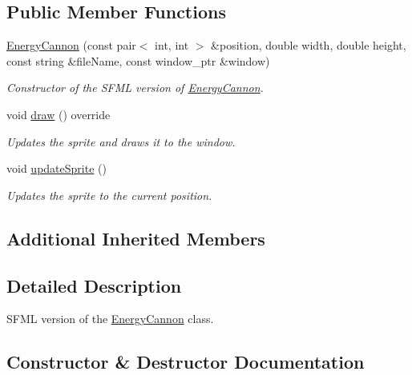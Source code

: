 \subsection*{Public Member Functions}
\begin{DoxyCompactItemize}
\item 
\hyperlink{classGameSFML_1_1EnergyCannon_a456f26d38873ce81105fe14657bcbed3}{Energy\+Cannon} (const pair$<$ int, int $>$ \&position, double width, double height, const string \&file\+Name, const window\+\_\+ptr \&window)
\begin{DoxyCompactList}\small\item\em Constructor of the S\+F\+ML version of \hyperlink{classGameSFML_1_1EnergyCannon}{Energy\+Cannon}. \end{DoxyCompactList}\item 
void \hyperlink{classGameSFML_1_1EnergyCannon_a9c4c44e9ded9422d790c685d5901cb64}{draw} () override
\begin{DoxyCompactList}\small\item\em Updates the sprite and draws it to the window. \end{DoxyCompactList}\item 
void \hyperlink{classGameSFML_1_1EnergyCannon_a2d71ccd7276055f9b5f9e688545d5982}{update\+Sprite} ()
\begin{DoxyCompactList}\small\item\em Updates the sprite to the current position. \end{DoxyCompactList}\end{DoxyCompactItemize}
\subsection*{Additional Inherited Members}


\subsection{Detailed Description}
S\+F\+ML version of the \hyperlink{classGameSFML_1_1EnergyCannon}{Energy\+Cannon} class. 

\subsection{Constructor \& Destructor Documentation}
\mbox{\label{classGameSFML_1_1EnergyCannon_a456f26d38873ce81105fe14657bcbed3}} 
